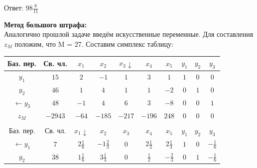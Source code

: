 \documentclass[a4paper,14pt]{extarticle}
\begin{document}
Ответ: $98\frac{8}{11}$\bigbreak

\textbf{Метод большого штрафа:}\\
Аналогично прошлой задаче введём искусственные переменные. Для составления $z_M$ положим, что M = 27. Составим симплекс таблицу:
\begin{center}
    \begin{tabular}{|c|c|c|c|c|c|c|c|c|c|}
        \hline
        Баз. пер.        & Св. чл.            & $x_1$             & $x_2$              & $x_3 \downarrow$ & $x_4 $           & $x_5$             & $y_1$             & $y_2$             & $y_3$             \\
        \hline
        $y_1$            & $15$               & $2$               & $-1$               & $1$              & $3$              & $1$               & $1$               & $0$               & $0$               \\
        \hline
        $y_2$            & $46$               & $1$               & $4$                & $1$              & $1$              & $-2$              & $0$               & $1$               & $0$               \\
        \hline
        $\leftarrow y_3$ & $48$               & $-1$              & $4$                & $6$              & $3$              & $-8$              & $0$               & $0$               & $1$               \\
        \hline
        $z_M$            & $-2943$            & $-64$             & $-185$             & $-217$           & $-196$           & $248$             & $0$               & $0$               & $0$               \\
        \hline
        \multicolumn{10}{c}{}                                                                                                                                                                                \\
        \hline
        Баз. пер.        & Св. чл.            & $x_1 \downarrow$  & $x_2$              & $x_3$            & $x_4 $           & $x_5$             & $y_1$             & $y_2$             & $y_3$             \\
        \hline
        $\leftarrow y_1$ & $7$                & $2\frac{1}{6}$    & $-1\frac{2}{3}$    & $0$              & $2\frac{1}{2}$   & $2\frac{1}{3}$    & $1$               & $0$               & $-\frac{1}{6}$    \\
        \hline
        $y_2$            & $38$               & $1\frac{1}{6}$    & $3\frac{1}{3}$     & $0$              & $\frac{1}{2}$    & $-\frac{2}{3}$    & $0$               & $1$               & $-\frac{1}{6}$    \\

\end{tabular}
\end{center}
\end{document}
